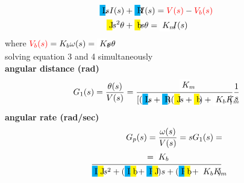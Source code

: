 \documentclass[hyperref={pdfpagelabels=true}]{beamer}
\begin{document}
\begin{frame}
{\begin{columns}
\begin{column}{0.5\textwidth}
{\begin{tcolorbox}[title=Laplace Domain,width=5.85 cm]
\begin{align}
\colorbox{cyan}{\hbox to 0.3 mm{L\hfill}}sI(s)&+\colorbox{cyan}{\hbox to 0.3 mm{R\hfill}}I(s)=\textcolor{red}{V(s)}-\textcolor{red}{V_b (s)} 
\\
\colorbox{yellow}{\hbox to 0.3 mm{J\hfill}}s^2 \theta &+ \colorbox{yellow}{\hbox to 0.3 mm{b \hfill}}s \theta =\colorbox{  white}{\hbox to 2.2 mm{\textit{${K_m}$}\hfill}}\ I(s)
\end{align}
where $\textcolor{red}{V_b(s)}=K_b\omega(s)=\colorbox{  white}{\hbox to 2.2 mm{\textit{${K_b}$}\hfill}}s\theta$ \\
solving equation 3 and 4 simultaneously \\
{\bf angular distance (rad)}
\begin{align*}
G_1(s)=\frac{\theta(s)}{V(s)}=\frac{\colorbox{  white}{\hbox to 2.2 mm{\textit{${K_m}$}\hfill}}}{[(\colorbox{cyan}{\hbox to 0.2 mm{L\hfill}}s+\colorbox{cyan}{\hbox to 0.2 mm{R\hfill}})(\colorbox{yellow}{\hbox to 0.2 mm{J\hfill}}s+\colorbox{yellow}{\hbox to 0.2 mm{b\hfill}})+\colorbox{  white}{\hbox to 5 mm{\textit{${K_bK_m}$}\hfill}}]} \frac{1}{s}
\end{align*}
{\bf angular rate (rad/sec)}
\begin{align*}
G_p(s)=\frac{\omega(s)}{V(s)}=sG_1(s)=\\ \frac{=\colorbox{  white}{\hbox to 2.2 mm{\textit{${K_b}$}\hfill}}}{\colorbox{cyan}{\hbox to 0.3 mm{L\hfill}}\colorbox{yellow}{\hbox to 0.3 mm{J\hfill}}s^2+(\colorbox{cyan}{\hbox to 0.3 mm{L\hfill}}\colorbox{yellow}{\hbox to 0.3 mm{b\hfill}}+\colorbox{cyan}{\hbox to 0.3 mm{R\hfill}}\colorbox{yellow}{\hbox to 0.3 mm{J\hfill}})s+(\colorbox{cyan}{\hbox to 0.3 mm{R\hfill}}\colorbox{yellow}{\hbox to 0.3 mm{b\hfill}}+\colorbox{  white}{\hbox to 5.2 mm{\textit{${K_bK_m}$}\hfill}})}
\end{align*}

\end{tcolorbox}

}

\end{column}    
\end{columns}
}
\label{motor}

\end{frame}
\end{document}
